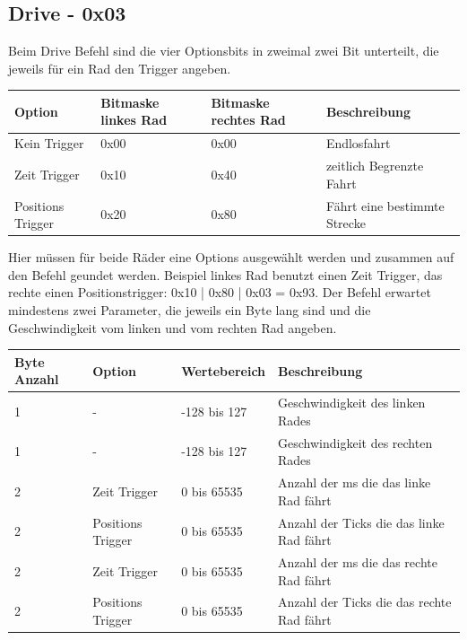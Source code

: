 \documentclass[a4paper]{article}
\begin{document}
	\subsection{Drive - 0x03}

	Beim Drive Befehl sind die vier Optionsbits in zweimal zwei Bit unterteilt, die jeweils für ein Rad den Trigger angeben.

	\begin{tabularx}{\linewidth}{|l|l|l|X|}
		\hline
		\textbf{Option} & \textbf{Bitmaske linkes Rad} & \textbf{Bitmaske rechtes Rad} & \textbf{Beschreibung} \\
		\hline
		\hline
		Kein Trigger	& 0x00						   & 0x00						   & Endlosfahrt \\
		\hline
		Zeit Trigger	& 0x10						   & 0x40						   & zeitlich Begrenzte Fahrt\\
		\hline
		Positions Trigger & 0x20					   & 0x80						   & Fährt eine bestimmte Strecke \\
		\hline
	\end{tabularx}
	
	Hier müssen für beide Räder eine Options ausgewählt werden und zusammen auf den Befehl geundet werden. Beispiel linkes
	Rad benutzt einen Zeit Trigger, das rechte einen Positionstrigger: 0x10 | 0x80 | 0x03 = 0x93.
	Der Befehl erwartet mindestens zwei Parameter, die jeweils ein Byte lang sind und die Geschwindigkeit vom linken und
	vom rechten Rad angeben.

	\begin{tabularx}{\linewidth}{|l|l|l|X|}
		\hline
		\textbf{Byte Anzahl} & \textbf{Option} & \textbf{Wertebereich} & \textbf{Beschreibung} \\
		\hline
		\hline
		1					 & - & -128 bis 127 & Geschwindigkeit des linken Rades \\
		\hline
		1					 & - & -128 bis 127 & Geschwindigkeit des rechten Rades\\
		\hline
		2					 & Zeit Trigger & 0 bis 65535 &  Anzahl der ms die das linke Rad fährt\\
		\hline
		2					 & Positions Trigger & 0 bis 65535 &  Anzahl der Ticks die das linke Rad fährt\\
		\hline
		2					 & Zeit Trigger & 0 bis 65535 &  Anzahl der ms die das rechte Rad fährt\\
		\hline
		2					 & Positions Trigger & 0 bis 65535 &  Anzahl der Ticks die das rechte Rad fährt\\
		\hline
	\end{tabularx}
	
\end{document}
